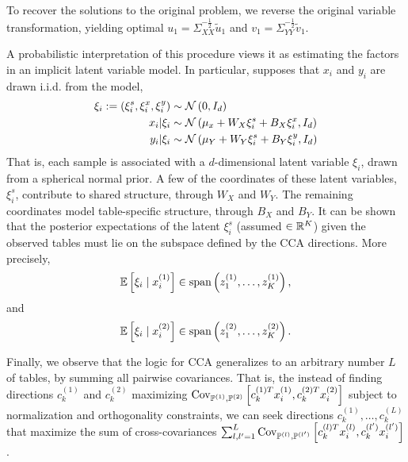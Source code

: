 \documentclass{article}
\begin{document}
To recover the solutions to the original problem, we reverse the original
variable transformation, yielding optimal $u_{1} =
\Sigma_{XX}^{-\frac{1}{2}}\tilde{u}_{1}$ and $v_{1} =
\Sigma_{YY}^{-\frac{1}{2}}\tilde{v}_{1}$.

A probabilistic interpretation of this procedure views it as estimating the
factors in an implicit latent variable model. In particular,
\citep{bach2005probabilistic} supposes that $x_{i}$ and $y_{i}$ are drawn i.i.d.
from the model,
\begin{align*}
  \xi_{i} := \left(\xi_{i}^{s}, \xi_{i}^{x}, \xi_{i}^{y}\right) &\sim
  \mathcal{N}\left(0, I_{d}\right) \\
  x_{i} \vert \xi_{i} &\sim \mathcal{N}\left(\mu_{x} + W_{X}\xi_{i}^{s} + B_{X}\xi_{i}^{x}, I_{d} \right) \\
  y_{i} \vert \xi_{i} &\sim \mathcal{N}\left(\mu_{Y} + W_{Y}\xi_{i}^{s} + B_{Y}\xi_{i}^{y}, I_{d}\right)
\end{align*}
That is, each sample is associated with a $d$-dimensional latent variable
$\xi_{i}$, drawn from a spherical normal prior. A few of the coordinates of
these latent variables, $\xi_{i}^{s}$, contribute to shared structure, through
$W_{X}$ and $W_{Y}$. The remaining coordinates model table-specific structure,
through $B_{X}$ and $B_{Y}$. It can be shown that the posterior expectations of
the latent $\xi_{i}^{s}$ (assumed $\in \mathbb{R}^{K}$) given the observed tables
must lie on the subspace defined by the CCA directions. More precisely,
\begin{align*}
  \mathbb{E}\left[{\xi_{i} \mid x_{i}^{(1)}}\right] \in \text{span}\left(z_{1}^{(1)},
    \dots, z_{K}^{(1)}\right),
\end{align*}
and
\begin{align*}
  \mathbb{E}\left[{\xi_{i} \mid x_{i}^{(2)}}\right] \in \text{span}\left(z_{1}^{(2)},
    \dots, z_{K}^{(2)}\right).
\end{align*}

Finally, we observe that the logic for CCA generalizes to an arbitrary number
$L$ of tables, by summing all pairwise covariances. That is, the instead of
finding directions $c_{k}^{(1)}$ and $c_{k}^{(2)}$ maximizing
$\mathrm{Cov}_{\mathbb{P}^{(1)}, \mathbb{P}^{(2)}}\left[{c_{k}^{(1)T}x_{i}^{(1)},
  c_{k}^{(2)T}x_{i}^{(2)}}\right]$ subject to normalization and orthogonality
constraints, we can seek directions $c_{k}^{(1)}, \dots, c_{k}^{(L)}$ that
maximize the sum of cross-covariances $\sum_{l,l^{\prime} = 1}^{L}
\mathrm{Cov}_{\mathbb{P}^{(l)}, \mathbb{P}^{(l^{\prime})}}\left[{c_{k}^{(l) T}x_{i}^{(l)},
  c_{k}^{(l^{\prime})}x_{i}^{(l^{\prime})}}\right]$.
\end{document}
